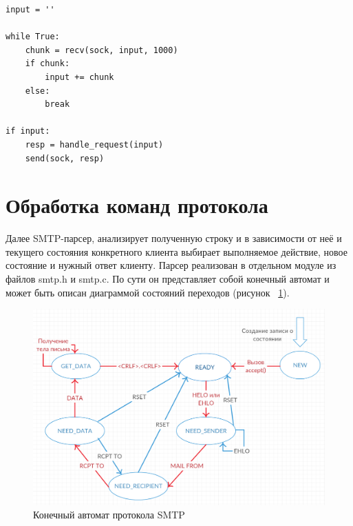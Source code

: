 \documentclass[a4paper,12pt]{report}
\begin{document}
\begin{verbatim}
input = ''

while True:
    chunk = recv(sock, input, 1000)
    if chunk:
        input += chunk
    else:
        break

if input:
    resp = handle_request(input)
    send(sock, resp)

\end{verbatim}



\section{Обработка команд протокола}

Далее SMTP-парсер, анализирует полученную строку и в зависимости от неё и текущего состояния конкретного клиента выбирает выполняемое действие, новое состояние и нужный ответ клиенту. Парсер реализован в отдельном модуле из файлов smtp.h и smtp.c. По сути он представляет собой конечный автомат и может быть описан диаграммой состояний переходов (рисунок ~\ref{fig:smtp_fsm}).

\begin{figure}
\centering
\includegraphics[width=\textwidth]{diagramms/smtp_fsm.png}
\caption{Конечный автомат протокола SMTP}
\label{fig:smtp_fsm}
\end{figure}
\end{document}
